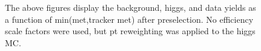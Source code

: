 \begin{figure}[!hbtp]
\begin{center}
\label{}
\caption{The above figures display the background, higgs, and data yields as a function of min(met,tracker met) after preselection. No efficiency scale factors were used, but pt reweighting was applied to the higgs MC.}
\end{center}
\end{figure}

